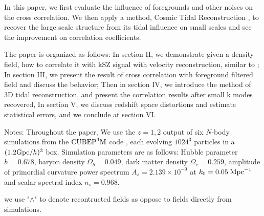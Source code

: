 In this paper, 
we first evaluate the influence of foregrounds and other noises 
on the cross correlation. 
We then apply a method, Cosmic Tidal Reconstruction \cite{2012:pen,2015:zhu}, 
to recover the large scale structure from its tidal influence on small scales 
and see the improvement on correlation coefficients. 

The paper is organized as follows: 
In section II, we demonstrate given a density field, how to correlate it with kSZ signal with velocity reconstruction, similar to \cite{Shao11}; 
In section III, we present the result of cross correlation with foreground filtered field 
and discuss the behavior; 
Then in section IV, we introduce the method of 3D tidal reconstruction, 
and present the correlation results after small k modes recovered, 
In section V, we discuss redshift space distortions and estimate statistical errors, 
and we conclude at section VI.


Notes: 
Throughout the paper, We use the $z=1,2$ output of six $N$-body simulations from the
$\mathrm{CUBEP}^3\mathrm{M}$ code \cite{2013:code}, each evolving $1024^3$ particles in a $(1.2\mathrm{Gpc}/h)^3$ box. 
Simulation parameters are as follows: Hubble parameter $h=0.678$, baryon
density $\Omega_{b}=0.049$, dark matter density $\Omega_{c}=0.259$,
amplitude of primordial curvature power spectrum $A_s=2.139\times10^{-9}$ at 
$k_0=0.05\;\mathrm{Mpc}^{-1}$ and scalar spectral index $n_s=0.968$.

we use "$\wedge$" to denote recontructed fields as 
oppose to fields directly from simulations.
